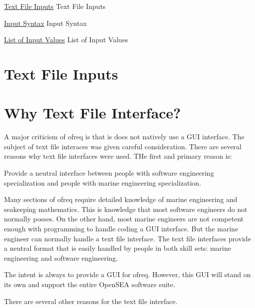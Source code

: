 \hyperlink{WhyTextFiles}{Text File Inputs} Text File Inputs

\hyperlink{InputSyntax}{Input Syntax} Input Syntax

\hyperlink{InputValues}{List of Input Values} List of Input Values \hypertarget{WhyTextFiles}{}\section{Text File Inputs}\label{WhyTextFiles}
\section*{Why Text File Interface?}

A major criticism of ofreq is that is does not natively use a G\-U\-I interface. The subject of text file interaces was given careful consideration. There are several reasons why text file interfaces were used. T\-He first and primary reason is\-:


\begin{DoxyItemize}
\item Provide a neutral interface between people with software engineering specialization and people with marine engineering specialization.
\end{DoxyItemize}

Many sections of ofreq require detailed knowledge of marine engineering and seakeeping mathematics. This is knowledge that most software engineers do not normally posses. On the other hand, most marine engineers are not competent enough with programming to handle coding a G\-U\-I interface. But the marine engineer can normally handle a text file interface. The text file interfaces provide a neutral format that is easily handled by people in both skill sets\-: marine engineering and software engineering.

The intent is always to provide a G\-U\-I for ofreq. However, this G\-U\-I will stand on its own and support the entire Open\-S\-E\-A software suite.

There are several other reasons for the text file interface.


